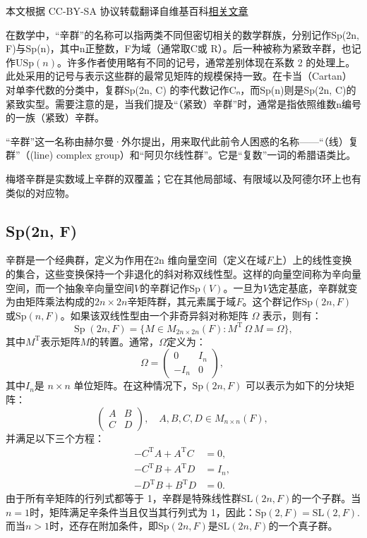 
本文根据 CC-BY-SA 协议转载翻译自维基百科\href{https://en.wikipedia.org/wiki/Symplectic_group}{相关文章}

在数学中，“辛群”的名称可以指两类不同但密切相关的数学群族，分别记作Sp(2n, F)与Sp(n)，其中n正整数，F为域（通常取C或 R）。后一种被称为紧致辛群，也记作$\mathrm{USp}(n)$。许多作者使用略有不同的记号，通常差别体现在系数 2 的处理上。此处采用的记号与表示这些群的最常见矩阵的规模保持一致。在卡当（Cartan）对单李代数的分类中，复群Sp(2n, C) 的李代数记作Cₙ，而Sp(n)则是Sp(2n, C)的紧致实型。需要注意的是，当我们提及“（紧致）辛群”时，通常是指依照维数n编号的一族（紧致）辛群。

“辛群”这一名称由赫尔曼·外尔提出，用来取代此前令人困惑的名称——“（线）复群”（(line) complex group）和“阿贝尔线性群”。它是“复数”一词的希腊语类比。

梅塔辛群是实数域上辛群的双覆盖；它在其他局部域、有限域以及阿德尔环上也有类似的对应物。
\subsection{Sp(2n, F)}
辛群是一个经典群，定义为作用在2n 维向量空间（定义在域$F$上）上的线性变换的集合，这些变换保持一个非退化的斜对称双线性型。这样的向量空间称为辛向量空间，而一个抽象辛向量空间$V$的辛群记作$\mathrm{Sp}(V)$。一旦为$V$选定基底，辛群就变为由矩阵乘法构成的$2n \times 2n$辛矩阵群，其元素属于域$F$。这个群记作$\mathrm{Sp}(2n, F)$或$\mathrm{Sp}(n, F)$。如果该双线性型由一个非奇异斜对称矩阵 $\Omega$ 表示，则有：
$$
\operatorname{Sp}(2n,F) = \{ M \in M_{2n \times 2n}(F) : M^{\mathrm{T}} \, \Omega \, M = \Omega \},~
$$
其中$M^{\mathrm{T}}$表示矩阵$M$的转置。通常，$\Omega$定义为：
$$
\Omega = 
\begin{pmatrix}
0 & I_n \\
- I_n & 0
\end{pmatrix},~
$$
其中$I_n$是 $n \times n$ 单位矩阵。在这种情况下，$\mathrm{Sp}(2n, F)$ 可以表示为如下的分块矩阵：
$$
\begin{pmatrix}
A & B \\
C & D
\end{pmatrix}, \quad A, B, C, D \in M_{n \times n}(F),~
$$
并满足以下三个方程：
$$
\begin{aligned}
- C^{\mathrm{T}} A + A^{\mathrm{T}} C &= 0, \\
- C^{\mathrm{T}} B + A^{\mathrm{T}} D &= I_n, \\
- D^{\mathrm{T}} B + B^{\mathrm{T}} D &= 0.
\end{aligned}~
$$
由于所有辛矩阵的行列式都等于 1，辛群是特殊线性群$\mathrm{SL}(2n, F)$的一个子群。当$n = 1$时，矩阵满足辛条件当且仅当其行列式为 1，因此：$\mathrm{Sp}(2, F) = \mathrm{SL}(2, F)$.而当$n > 1$时，还存在附加条件，即$\mathrm{Sp}(2n, F)$是$\mathrm{SL}(2n, F)$的一个真子群。

